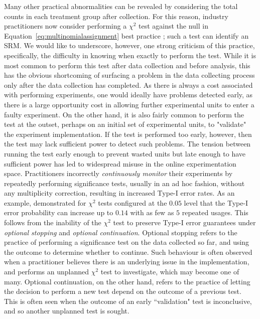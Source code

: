 \documentclass[11pt]{article}
\begin{document}
Many other practical abnormalities can be revealed by considering the total counts in each treatment group after collection.
For this reason, industry practitioners now consider performing a $\chi^2$ test against the null in Equation~\ref{eq:multinomialassignment} best practice \citep{linkedin}; such a test can identify an SRM.
We would like to underscore, however, one strong criticism of this practice,
specifically,
the difficulty in knowing when exactly to perform the test.
While it is most common to perform this test after data collection and before analysis,
this has the obvious shortcoming of surfacing a problem in the data collecting process only after the data collection has completed.
As there is always a cost associated with performing experiments, one would ideally have problems detected early, as there is a large opportunity cost in allowing further experimental units to enter a faulty experiment.
On the other hand, it is also fairly common to perform the test at the outset, perhaps on an initial set of experimental units, to "validate" the experiment implementation.
If the test is performed too early, however, then the test may lack sufficient power to detect such problems.
The tension between running the test early enough to prevent wasted units but late enough to have sufficient power has led to widespread misuse in the online experimentation space.
Practitioners incorrectly \textit{continuously monitor} their experiments by repeatedly performing significance tests, usually in an ad hoc fashion, without any multiplicity correction, resulting in increased Type-I error rates.
As an example, \cite{armitage} demonstrated for $\chi^2$ tests configured at the $0.05$ level that the Type-I error probability can increase up to $0.14$ with as few as $5$ repeated usages.
This follows from the inability of the $\chi^2$ test to preserve Type-I error guarantees under \textit{optional stopping} and \textit{optional continuation}.
Optional stopping refers to the practice of performing a significance test on the data collected so far, and using the outcome to determine whether to continue.
Such behaviour is often observed when a practitioner believes there is an underlying issue in the implementation, and performs an unplanned $\chi^2$ test to investigate,
which may become one of many.
Optional continuation, on the other hand, refers to the practice of letting the decision to perform a new test depend on the outcome of a previous test.
This is often seen when the outcome of an early ``validation" test is inconclusive, and so another unplanned test is sought.
\end{document}
